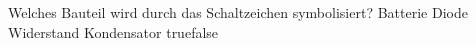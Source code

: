     {Welches Bauteil wird durch das Schaltzeichen symbolisiert?}
    {Batterie}
    {Diode}
    {Widerstand}
    {Kondensator}
    {true}{false}